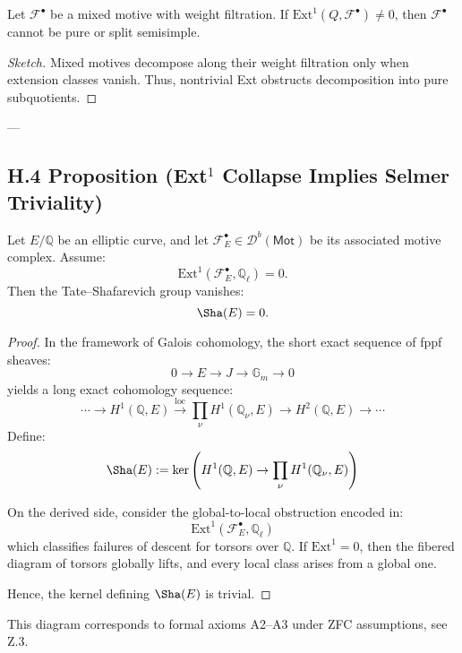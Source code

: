 \begin{lemma}
Let \( \mathcal{F}^\bullet \) be a mixed motive with weight filtration.  
If \( \mathrm{Ext}^1(Q, \mathcal{F}^\bullet) \neq 0 \), then \( \mathcal{F}^\bullet \) cannot be pure or split semisimple.
\end{lemma}

\begin{proof}[Sketch]
Mixed motives decompose along their weight filtration only when extension classes vanish.  
Thus, nontrivial Ext obstructs decomposition into pure subquotients.
\end{proof}

---

\subsection*{H.4 Proposition (Ext$^1$ Collapse Implies Selmer Triviality)}

\begin{proposition}
Let \( E/\mathbb{Q} \) be an elliptic curve, and let \( \mathcal{F}_E^\bullet \in \mathcal{D}^b(\mathsf{Mot}) \) be its associated motive complex.  
Assume:
\[
\mathrm{Ext}^1(\mathcal{F}_E^\bullet, \mathbb{Q}_\ell) = 0.
\]
Then the Tate–Shafarevich group vanishes:
\[
\Sha(E) = 0.
\]
\end{proposition}

\begin{proof}
In the framework of Galois cohomology, the short exact sequence of fppf sheaves:
\[
0 \to E \to J \to \mathbb{G}_m \to 0
\]
yields a long exact cohomology sequence:
\[
\cdots \to H^1(\mathbb{Q}, E) \xrightarrow{\mathrm{loc}} \prod_\nu H^1(\mathbb{Q}_\nu, E) \to H^2(\mathbb{Q}, E) \to \cdots
\]
Define:
\[
\Sha(E) := \ker \left( H^1(\mathbb{Q}, E) \to \prod_\nu H^1(\mathbb{Q}_\nu, E) \right)
\]

On the derived side, consider the global-to-local obstruction encoded in:
\[
\mathrm{Ext}^1(\mathcal{F}_E^\bullet, \mathbb{Q}_\ell)
\]
which classifies failures of descent for torsors over \( \mathbb{Q} \).  
If \( \mathrm{Ext}^1 = 0 \), then the fibered diagram of torsors globally lifts, and every local class arises from a global one.

Hence, the kernel defining \( \Sha(E) \) is trivial.
\end{proof}

\begin{remark}
This diagram corresponds to formal axioms A2–A3 under ZFC assumptions, see Z.3.
\end{remark}

